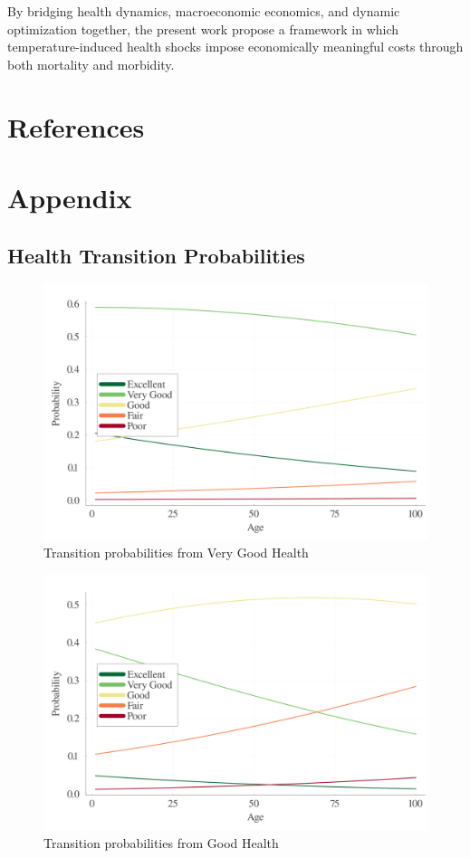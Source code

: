 \documentclass{article}
\begin{document}
By bridging health dynamics, macroeconomic economics, and dynamic optimization together,
the present work propose a framework in which temperature-induced health shocks impose
economically meaningful costs through both mortality and morbidity.

\section{References}

\printbibliography

\newpage
\section{Appendix}

\subsection{Health Transition Probabilities}

\begin{figure}[H]\label{fig:health_transition_2}
    \begin{center}
        \includegraphics[width=0.4\linewidth]{output/health_transition_2.png}
        \caption{Transition probabilities from Very Good Health}    
    \end{center}
\end{figure}

\begin{figure}[H]\label{fig:health_transition_3}
    \begin{center}
        \includegraphics[width=0.4\linewidth]{output/health_transition_3.png}
        \caption{Transition probabilities from Good Health}  
    \end{center}  
\end{figure}
\end{document}

